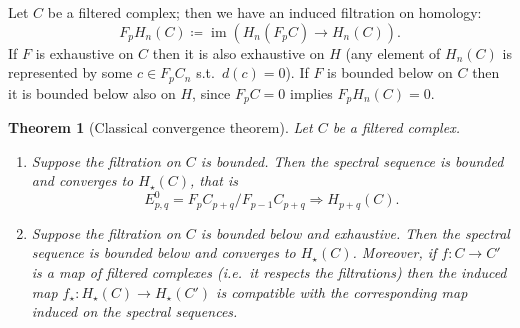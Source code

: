 \documentclass[a4paper]{article}
\newcommand{\Hs}{ H_{\star} }
\DeclareMathOperator{\Ima}{im}			%
\theoremstyle{plain}
\newtheorem{thm}{Theorem}[section]
\theoremstyle{definition}
\begin{document}
		Let $C$ be a filtered complex; then we have an induced filtration on homology: \[ F_pH_n(C) \coloneqq \Ima( H_n(F_pC) \to H_n(C)) .\]
		If $F$ is exhaustive on $C$ then it is also exhaustive on $H$ (any element of $H_n(C)$ is represented by some $c \in F_pC_n$ s.t.\ $d(c) = 0$). If $F$ is bounded below on $C$ then it is bounded below also on $H$, since $F_pC = 0$ implies $F_pH_n(C) = 0$.
		\begin{thm}[Classical convergence theorem]
			\label{thm:classical-convergence}
			Let $C$ be a filtered complex.
			\begin{enumerate}
				\item Suppose the filtration on $C$ is bounded. Then the spectral sequence is bounded and converges to $\Hs(C)$, that is \[E^0_{p,q} = F_pC_{p+q}/F_{p-1}C_{p+q} \Longrightarrow H_{p+q}(C).\]
				\item Suppose the filtration on $C$ is bounded below and exhaustive. Then the spectral sequence is bounded below and converges to $\Hs(C)$. Moreover, if $f\colon C \to C'$ is a map of filtered complexes (i.e.\ it respects the filtrations) then the induced map $f_{\star}\colon \Hs(C) \to \Hs(C')$ is compatible with the corresponding map induced on the spectral sequences.
			\end{enumerate}
		\end{thm}
\end{document}
